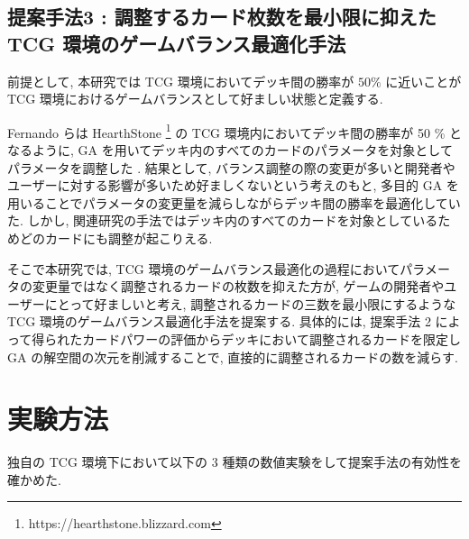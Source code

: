 \documentclass[twocolumn]{jarticle}
\begin{document}
\subsection{提案手法3 : 調整するカード枚数を最小限に抑えた TCG 環境のゲームバランス最適化手法}
\label{hearthstone}
前提として, 本研究では TCG 環境においてデッキ間の勝率が $50\%$ に近いことが TCG 環境におけるゲームバランスとして好ましい状態と定義する.
\par
Fernando らは HearthStone \footnote[1]{https://hearthstone.blizzard.com} の TCG 環境内においてデッキ間の勝率が 50 \% となるように, GA を用いてデッキ内のすべてのカードのパラメータを対象としてパラメータを調整した \cite{Hearthstone}.
結果として, バランス調整の際の変更が多いと開発者やユーザーに対する影響が多いため好ましくないという考えのもと, 多目的 GA を用いることでパラメータの変更量を減らしながらデッキ間の勝率を最適化していた.
しかし, 関連研究の手法ではデッキ内のすべてのカードを対象としているためどのカードにも調整が起こりえる.
\par
そこで本研究では, TCG 環境のゲームバランス最適化の過程においてパラメータの変更量ではなく調整されるカードの枚数を抑えた方が, ゲームの開発者やユーザーにとって好ましいと考え, 調整されるカードの三数を最小限にするような TCG 環境のゲームバランス最適化手法を提案する.
具体的には, 提案手法 2 によって得られたカードパワーの評価からデッキにおいて調整されるカードを限定し GA の解空間の次元を削減することで, 直接的に調整されるカードの数を減らす.

\section{実験方法}
独自の TCG 環境下において以下の 3 種類の数値実験をして提案手法の有効性を確かめた.
\end{document}
